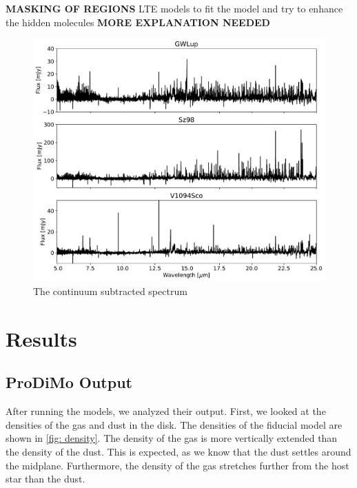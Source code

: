 \documentclass[oneside, single, authoryear, semicolon]{lion-msc}
\newcommand{\4}{$_4$}
\newcommand{\3}{$_3$}
\newcommand{\2}{$_2$}
\begin{document}
\textbf{MASKING OF REGIONS}
LTE models to fit the model and try to enhance the hidden molecules
\textbf{MORE EXPLANATION NEEDED}
\begin{figure}[!ht]
    \centering
    \includegraphics[width=\linewidth]{Figures/Measurements.pdf}
    \caption{The continuum subtracted spectrum}
    \label{fig: V1094Sco}
\end{figure}



\chapter{Results}\label{Ch: Results}
\section{ProDiMo Output}
After running the models, we analyzed their output. First, we looked at the densities of the gas and dust in the disk. The densities of the fiducial model are shown in \autoref{fig: density}. The density of the gas is more vertically extended than the density of the dust. This is expected, as we know that the dust settles around the midplane. Furthermore, the density of the gas stretches further from the host star than the dust.
\end{document}
